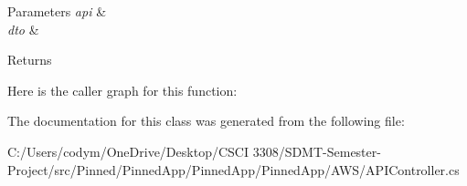 \begin{DoxyParams}{Parameters}
{\em api} & \\
\hline
{\em dto} & \\
\hline
\end{DoxyParams}
\begin{DoxyReturn}{Returns}

\end{DoxyReturn}
Here is the caller graph for this function\+:


The documentation for this class was generated from the following file\+:\begin{DoxyCompactItemize}
\item 
C\+:/\+Users/codym/\+One\+Drive/\+Desktop/\+C\+S\+C\+I 3308/\+S\+D\+M\+T-\/\+Semester-\/\+Project/src/\+Pinned/\+Pinned\+App/\+Pinned\+App/\+Pinned\+App/\+A\+W\+S/A\+P\+I\+Controller.\+cs\end{DoxyCompactItemize}
